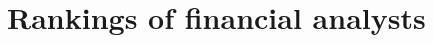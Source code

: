 \documentclass[a4paper,twoside,12pt,openright,notitlepage]{report}\usepackage[]{graphicx}\usepackage[]{color}
\begin{document}
\chapter{Rankings of financial  analysts}
\label{ch4}
%













\end{document}
